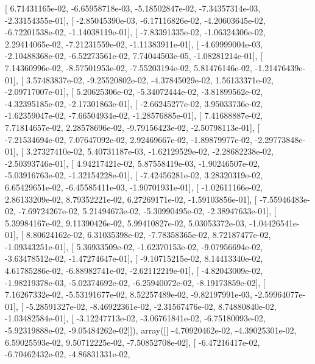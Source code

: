 \documentclass{article}
\begin{document}
       [  6.71431165e-02,  -6.65958718e-03,  -5.18502847e-02,
         -7.34357314e-03,  -2.33154355e-01],
       [ -2.85045390e-03,  -6.17116826e-02,  -4.20603645e-02,
         -6.72201538e-02,  -1.14038119e-01],
       [ -7.83391335e-02,  -1.06324306e-02,   2.29414065e-02,
         -7.21231559e-02,  -1.11383911e-01],
       [ -4.69999004e-03,  -2.10488368e-02,  -6.52273561e-02,
          7.74044503e-05,  -1.08281214e-01],
       [  7.14360996e-02,  -8.57501953e-02,  -7.55203194e-02,
          5.81476146e-02,  -1.21476439e-01],
       [  3.57483837e-02,  -9.25520802e-02,  -4.37845029e-02,
          1.56133371e-02,  -2.09717007e-01],
       [  5.20625306e-02,  -5.34072444e-02,  -3.81899562e-02,
         -4.32395185e-02,  -2.17301863e-01],
       [ -2.66245277e-02,   3.95033736e-02,  -1.62359047e-02,
         -7.66504934e-02,  -1.28576885e-01],
       [  7.41688887e-02,   7.71814657e-02,   2.28578696e-02,
         -9.79156423e-02,  -2.50798113e-01],
       [ -7.21534694e-02,   7.07647092e-02,   2.92469667e-02,
         -1.89879977e-02,  -2.29773848e-01],
       [  3.27327410e-02,   5.40731187e-03,  -1.62129529e-02,
         -2.28682238e-02,  -2.50393746e-01],
       [  4.94217421e-02,   5.87558419e-03,  -1.90246507e-02,
         -5.03916763e-02,  -1.32154228e-01],
       [ -7.42456281e-02,   3.28320319e-02,   6.65429651e-02,
         -6.45585411e-03,  -1.90701931e-01],
       [ -1.02611166e-02,   2.86133209e-02,   8.79352221e-02,
          6.27269171e-02,  -1.59103856e-01],
       [ -7.55946483e-02,  -7.69724267e-02,   5.21494673e-02,
         -5.30990495e-02,  -2.38947633e-01],
       [  5.39984167e-02,   9.11390426e-02,   5.99410827e-02,
          5.03053372e-03,  -1.04426541e-01],
       [  8.80624162e-02,   6.31035398e-02,  -7.78358365e-02,
          8.72187477e-02,  -1.09343251e-01],
       [  5.36933509e-02,  -1.62370153e-02,  -9.07956694e-02,
         -3.63478512e-02,  -1.47274647e-01],
       [ -9.10715215e-02,   8.14413340e-02,   4.61785286e-02,
         -6.88982741e-02,  -2.62112219e-01],
       [ -4.82043009e-02,  -1.98219378e-03,  -5.02374692e-02,
         -6.25940072e-02,  -8.19173859e-02],
       [  7.16267332e-02,  -5.53191677e-02,   8.52257489e-02,
         -9.82197991e-03,  -2.59964077e-01],
       [ -5.28591327e-02,  -8.46922361e-02,  -2.31567476e-02,
          8.74880840e-02,  -1.03482584e-01],
       [ -3.12247713e-02,  -3.06761841e-02,  -6.75180093e-02,
         -5.92319888e-02,  -9.05484262e-02]]), array([[ -4.70920462e-02,  -4.39025301e-02,   6.59025593e-02,
          9.50712225e-02,  -7.50852708e-02],
       [ -6.47216417e-02,  -6.70462432e-02,  -4.86831331e-02,
\end{document}

